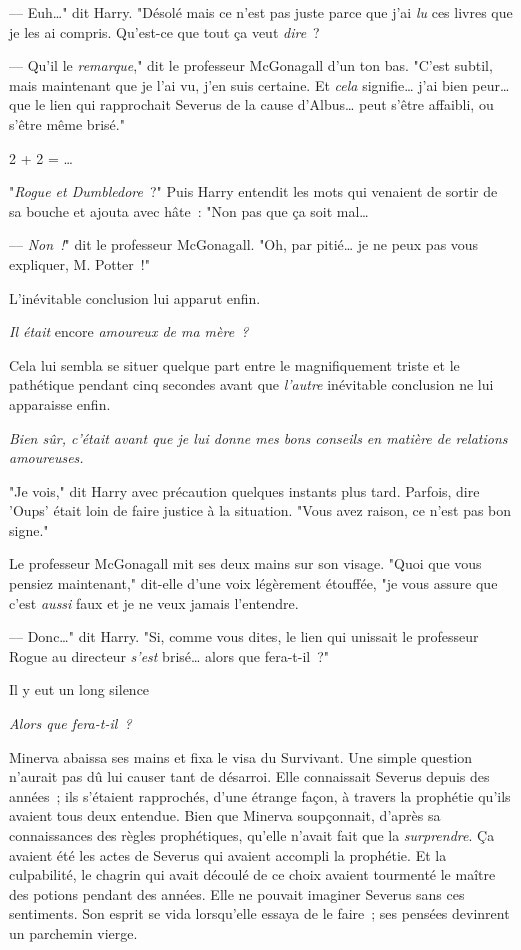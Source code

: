 --- Euh…" dit Harry. "Désolé mais ce n'est pas juste parce que j'ai \emph{lu} ces livres que je les ai compris. Qu'est-ce que tout ça veut \emph{dire}~?

--- Qu'il le \emph{remarque}," dit le professeur McGonagall d'un ton bas. "C'est subtil, mais maintenant que je l'ai vu, j'en suis certaine. Et \emph{cela} signifie… j'ai bien peur… que le lien qui rapprochait Severus de la cause d'Albus… peut s'être affaibli, ou s'être même brisé."

2 + 2 = …

"\emph{Rogue et Dumbledore}~?" Puis Harry entendit les mots qui venaient de sortir de sa bouche et ajouta avec hâte~: "Non pas que ça soit mal…

--- \emph{Non~!}" dit le professeur McGonagall. "Oh, par pitié… je ne peux pas vous expliquer, M. Potter~!"

L'inévitable conclusion lui apparut enfin.

\emph{Il était} encore \emph{amoureux de ma mère~?}

Cela lui sembla se situer quelque part entre le magnifiquement triste et le pathétique pendant cinq secondes avant que \emph{l'autre} inévitable conclusion ne lui apparaisse enfin.

\emph{Bien sûr, c'était avant que je lui donne mes bons conseils en matière de relations amoureuses.}

"Je vois," dit Harry avec précaution quelques instants plus tard. Parfois, dire 'Oups' était loin de faire justice à la situation. "Vous avez raison, ce n'est pas bon signe."

Le professeur McGonagall mit ses deux mains sur son visage. "Quoi que vous pensiez maintenant," dit-elle d'une voix légèrement étouffée, "je vous assure que c'est \emph{aussi} faux et je ne veux jamais l'entendre.

--- Donc…" dit Harry. "Si, comme vous dites, le lien qui unissait le professeur Rogue au directeur \emph{s'est} brisé… alors que fera-t-il~?"

Il y eut un long silence

\later

\emph{Alors que fera-t-il~?}

Minerva abaissa ses mains et fixa le visa du Survivant. Une simple question n'aurait pas dû lui causer tant de désarroi. Elle connaissait Severus depuis des années~; ils s'étaient rapprochés, d'une étrange façon, à travers la prophétie qu'ils avaient tous deux entendue. Bien que Minerva soupçonnait, d'après sa connaissances des règles prophétiques, qu'elle n'avait fait que la \emph{surprendre}. Ça avaient été les actes de Severus qui avaient accompli la prophétie. Et la culpabilité, le chagrin qui avait découlé de ce choix avaient tourmenté le maître des potions pendant des années. Elle ne pouvait imaginer Severus sans ces sentiments. Son esprit se vida lorsqu'elle essaya de le faire~; ses pensées devinrent un parchemin vierge.

